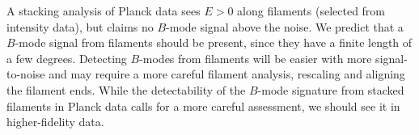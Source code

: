 A stacking analysis of Planck data \citep{2016A&A...586A.141P} sees $E>0$ along filaments (selected from intensity data), but claims no $B$-mode signal above the noise. We predict that a $B$-mode signal from filaments should be present, since they have a finite length of a few degrees.  Detecting $B$-modes from filaments will be easier with more signal-to-noise and may require a more careful filament analysis, rescaling and aligning the filament ends.  While the detectability of the $B$-mode signature from stacked filaments in Planck data calls for a more careful assessment, we should see it in higher-fidelity data. 

